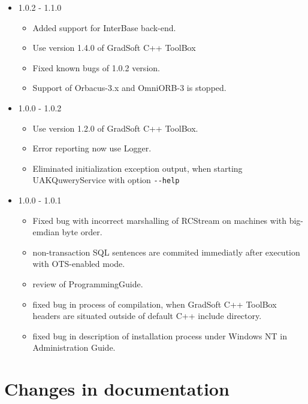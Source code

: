 \documentclass[10pt]{article}
\begin{document}
\begin{itemize}
 \item 1.0.2 - 1.1.0 
 \begin{itemize}
    \item Added support for InterBase back-end.
    \item Use version 1.4.0 of GradSoft C++ ToolBox
    \item Fixed known bugs of 1.0.2 version.
    \item Support of Orbacus-3.x and OmniORB-3 is stopped.
 \end{itemize}
 \item 1.0.0 - 1.0.2
 \begin{itemize}
    \item Use version 1.2.0 of GradSoft C++ ToolBox.
    \item Error reporting now use Logger.
    \item Eliminated initialization exception output, 
      when starting UAKQuweryService  with option \verb|--help|
 \end{itemize}
 \item 1.0.0 - 1.0.1 
 \begin{itemize}
    \item Fixed bug with incorrect marshalling of RCStream on machines
        with big-emdian byte order.
    \item non-transaction SQL sentences are commited immediatly after execution
        with OTS-enabled mode.
    \item review of ProgrammingGuide.
    \item fixed bug in process of compilation, when GradSoft C++ ToolBox headers are situated outside of default C++ include directory.
    \item fixed bug in description of installation process under Windows NT in Administration Guide.
 \end{itemize}
\end{itemize}

\section{  Changes in documentation }
\end{document}
